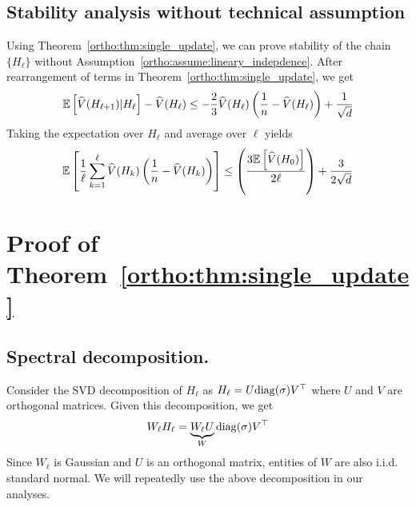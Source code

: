 \subsection*{Stability analysis without technical assumption}
 Using Theorem~\ref{ortho:thm:single_update}, we can prove stability of the chain $\{ H_\ell \}$ without Assumption~\ref{ortho:assume:lineary_indepdence}. After rearrangement of terms in Theorem~\ref{ortho:thm:single_update}, we get
 \begin{align*}
     \mathbb{E} \left[ \widehat{V}(H_{\ell+1})| H_\ell \right] - \widehat{V}(H_\ell) \leq - \frac{2}{3} \widehat{V}(H_\ell) \left( \frac{1}{n}- \widehat{V}(H_\ell) \right) + \frac{1}{ \sqrt{d}}
 \end{align*}
 Taking the expectation over $H_\ell$ and average over $\ell$ yields
 \begin{align*}
     \mathbb{E} \left[\frac{1}{\ell}\sum_{k=1}^\ell \widehat{V}(H_k) \left( \frac{1}{n}- \widehat{V}(H_k)\right)\right]  \leq \left(\frac{3 \mathbb{E} \left[ \widehat{V}(H_0) \right]}{2 \ell}\right) +\frac{3}{2 \sqrt{d}}
 \end{align*}
 
 
 \section{Proof of Theorem~\ref{ortho:thm:single_update}}
 \label{ortho:sec:proof_thm}
  
 \subsection*{Spectral decomposition.}
 Consider the SVD decomposition of $H_{\ell}$ as $H_{\ell} = U \mathrm{diag}(\sigma) V^\top$ where $U$ and $V$ are orthogonal matrices. Given this decomposition, we get
 \begin{align} \label{ortho:eq:wh}
     W_{\ell} H_{\ell} = \underbrace{W_{\ell} U}_{W} \mathrm{diag}(\sigma) V^\top 
 \end{align}
 Since $W_{\ell}$ is Gaussian and $U$ is an orthogonal matrix, entities of $W$ are also i.i.d. standard normal. We will repeatedly use the above decomposition in our analyses.
 
 
